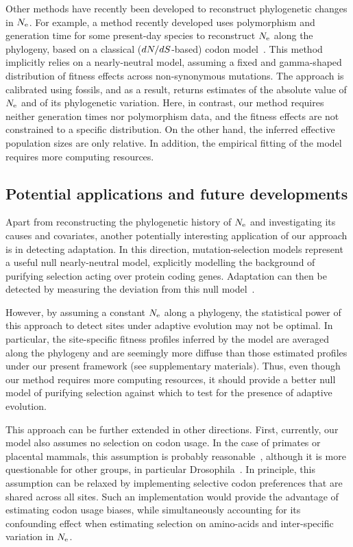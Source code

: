 \documentclass{MBE}
\begin{document}
	Other methods have recently been developed to reconstruct phylogenetic changes in $N_{\text{e}}$.
	For example, a method recently developed uses polymorphism and generation time for some present-day species to reconstruct $N_{\text{e}}$ along the phylogeny, based on a classical ($dN/dS$-based) {codon} model~\citep{Brevet2019}.
	This method implicitly relies on a {nearly-neutral} model, assuming a fixed and gamma-shaped distribution of fitness effects across {non-synonymous} mutations.
	The approach is calibrated using fossils, and as a result, returns estimates of the absolute value of $N_{\text{e}}$ and of its phylogenetic variation.
	Here, in contrast, our method requires neither generation times nor polymorphism data, and the fitness effects are not constrained to a specific distribution.
	On the other hand, the inferred effective population sizes are only relative.
	In addition, the empirical fitting of the model requires more computing resources.

	\subsection{Potential applications and future developments}

	Apart from reconstructing the phylogenetic history of $N_{\text{e}}$ and investigating its causes and covariates, another potentially interesting application of our approach is in detecting adaptation.
	In this direction, mutation-selection models represent a useful null {nearly-neutral} model, explicitly modelling the background of purifying selection acting over protein coding genes.
	Adaptation can then be detected by measuring the deviation from this null model~\citep{Rodrigue2016, Bloom2017}.

	However, by assuming a constant $N_{\text{e}}$ along a phylogeny, the statistical power of this approach to detect sites under adaptive evolution may not be optimal.
	In particular, the site-specific fitness profiles inferred by the model are averaged along the phylogeny and are seemingly more diffuse than those estimated profiles under our present framework (see supplementary materials).
	Thus, even though our method requires more computing resources, it should provide a better null model of purifying selection against which to test for the presence of adaptive evolution.

	This approach can be further extended in other directions.
	First, currently, our model also assumes no selection on {codon} usage.
	In the case of primates or placental mammals, this assumption is probably reasonable~\citep{Yang2008}, although it is more questionable for other groups, in particular Drosophila~\citep{Duret1999,Plotkin2011}.
	In principle, this assumption can be relaxed by implementing selective {codon} preferences that are shared across all sites.
	Such an implementation would provide the advantage of estimating {codon} usage biases, while simultaneously accounting for its confounding effect when estimating selection on amino-acids and inter-specific variation in $N_{\text{e}}$.
\end{document}
